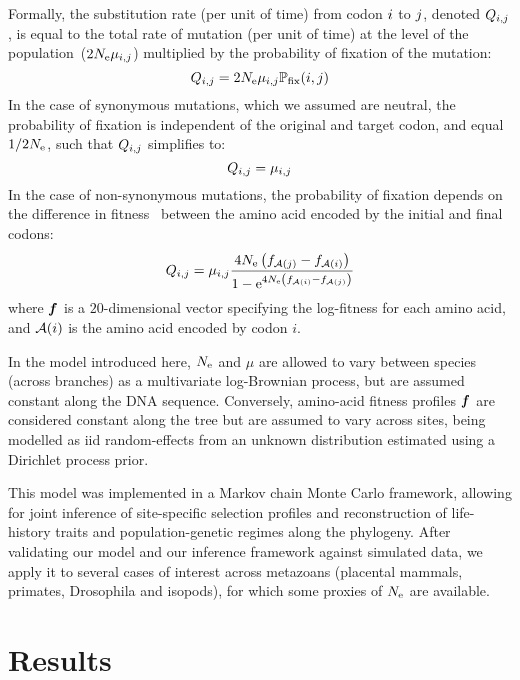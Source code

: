 Formally, the substitution rate (per unit of time) from codon ${i}$ to ${j}$, denoted $Q_{{i}, {j}}$, is equal to the total rate of mutation (per unit of time) at the level of the population~($2N_{\text{e}}\mu_{{i}, {j}}$) multiplied by the probability of fixation of the mutation:
\begin{equation}
{Q_{{i}, {j}}}
    = 2 N_{\text{e}} \mu_{{i}, {j}} \mathbb{P}_{\text{fix}}({i}, {j})
\end{equation}
In the case of synonymous mutations, which we assumed are neutral, the probability of fixation is independent of the original and target codon, and equal $1/2 N_{\text{e}}$, such that ${Q_{{i}, {j}}}$ simplifies to:
\begin{equation}
    Q_{{i}, {j}} = \mu_{{i}, {j}}
\end{equation}
In the case of non-synonymous mutations, the probability of fixation depends on the difference in fitness~\citep{Ohta1992} between the amino acid encoded by the initial and final codons:
\begin{equation}
    \label{eq:mutationSelection}
    {\submatrix_{\itoj}} = \mu_{\itoj} \dfrac{4 \Ne \left({\fitj - \fiti}\right)}{{1 - \e^{4 \Ne \left({\fiti - \fitj}\right)} }}
\end{equation}
where $\bm{f}$ is a $20$-dimensional vector specifying the log-fitness for each amino acid, and $\mathcal{A}({i})$ is the amino acid encoded by codon $i$.

In the model introduced here, $N_{\text{e}}$ and $\mu$ are allowed to vary between species (across branches) as a multivariate log-Brownian process, but are assumed constant along the DNA sequence.
Conversely, amino-acid fitness profiles $\bm{f}$ are considered constant along the tree but are assumed to vary across sites, being modelled as iid random-effects from an unknown distribution estimated using a Dirichlet process prior.

This model was implemented in a Markov chain Monte Carlo framework, allowing for joint inference of site-specific selection profiles and reconstruction of life-history traits and population-genetic regimes along the phylogeny.
After validating our model and our inference framework against simulated data, we apply it to several cases of interest across metazoans (placental mammals, primates, Drosophila and isopods), for which some proxies of $N_{\text{e}}$ are available.


\section{Results}
\label{sec:Results}

